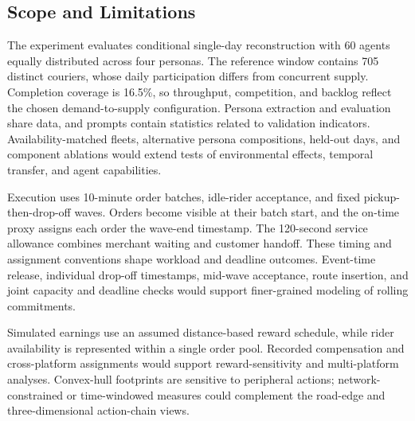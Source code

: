 \documentclass[letterpaper,journal]{IEEEtran}
\begin{document}
\subsection{Scope and Limitations}
The experiment evaluates conditional single-day reconstruction with 60 agents equally distributed across four personas. The reference window contains 705 distinct couriers, whose daily participation differs from concurrent supply. Completion coverage is 16.5\%, so throughput, competition, and backlog reflect the chosen demand-to-supply configuration. Persona extraction and evaluation share data, and prompts contain statistics related to validation indicators. Availability-matched fleets, alternative persona compositions, held-out days, and component ablations would extend tests of environmental effects, temporal transfer, and agent capabilities.

Execution uses 10-minute order batches, idle-rider acceptance, and fixed pickup-then-drop-off waves. Orders become visible at their batch start, and the on-time proxy assigns each order the wave-end timestamp. The 120-second service allowance combines merchant waiting and customer handoff. These timing and assignment conventions shape workload and deadline outcomes. Event-time release, individual drop-off timestamps, mid-wave acceptance, route insertion, and joint capacity and deadline checks would support finer-grained modeling of rolling commitments.

Simulated earnings use an assumed distance-based reward schedule, while rider availability is represented within a single order pool. Recorded compensation and cross-platform assignments would support reward-sensitivity and multi-platform analyses. Convex-hull footprints are sensitive to peripheral actions; network-constrained or time-windowed measures could complement the road-edge and three-dimensional action-chain views.
\end{document}
